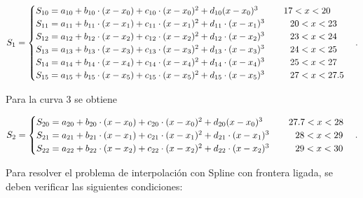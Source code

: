 \begin{equation}
        S_1 =
        \begin{cases}
            S_{10} = a_{10} + b_{10} \cdot (x-x_0) + c_{10} \cdot (x-x_0)^2 + d_{10} (x-x_0)^3 \hspace{10mm} 17 <x<20 \\
            S_{11} = a_{11} + b_{11} \cdot (x-x_1) + c_{11} \cdot (x-x_1)^2 + d_{11} \cdot (x-x_1)^3 \hspace{10mm} 20<x<23 \\
            S_{12} = a_{12} + b_{12} \cdot (x-x_2) + c_{12} \cdot (x-x_2)^2 + d_{12} \cdot (x-x_2)^3 \hspace{10mm} 23<x<24 \\
            S_{13} = a_{13} + b_{13} \cdot (x-x_3) + c_{13} \cdot (x-x_3)^2 + d_{13} \cdot (x-x_3)^3 \hspace{10mm} 24<x<25 \\
            S_{14} = a_{14} + b_{14} \cdot (x-x_4) + c_{14} \cdot (x-x_4)^2 + d_{14} \cdot (x-x_4)^3 \hspace{10mm} 25<x<27 \\
            S_{15} = a_{15} + b_{15} \cdot (x-x_5) + c_{15} \cdot (x-x_5)^2 + d_{15} \cdot (x-x_5)^3 \hspace{10mm} 27 <x<27.5 \\
        \end{cases}.
\end{equation}

Para la curva 3 se obtiene

\begin{equation}
        S_2 =
        \begin{cases}
            S_{20} = a_{20} + b_{20} \cdot (x-x_0) + c_{20} \cdot (x-x_0)^2 + d_{20} (x-x_0)^3 \hspace{10mm} 27.7 <x<28 \\
            S_{21} = a_{21} + b_{21} \cdot (x-x_1) + c_{21} \cdot (x-x_1)^2 + d_{21} \cdot (x-x_1)^3 \hspace{10mm} 28<x<29 \\
            S_{22} = a_{22} + b_{22} \cdot (x-x_2) + c_{22} \cdot (x-x_2)^2 + d_{22} \cdot (x-x_2)^3 \hspace{10mm} 29<x<30 \\
        \end{cases}.
\end{equation}

Para resolver el problema de interpolación con Spline con frontera ligada, se deben verificar las siguientes condiciones:

